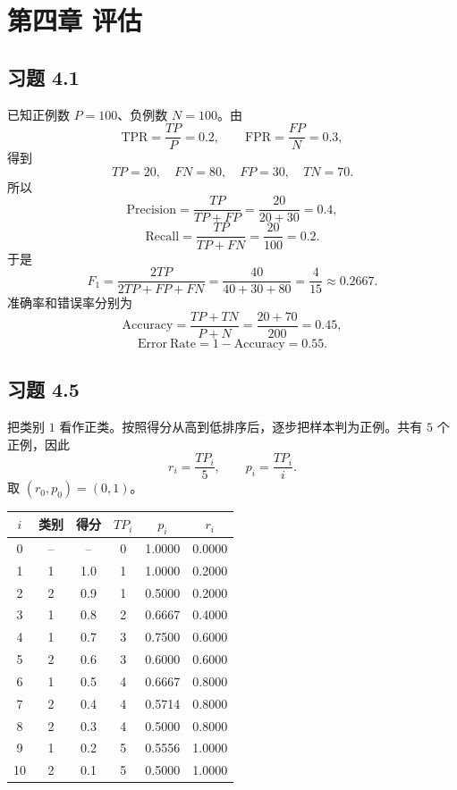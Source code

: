 \documentclass[UTF8,a4paper,12pt]{ctexart}
\begin{document}
\section*{第四章 评估}

\subsection*{习题 4.1}

已知正例数 $P=100$、负例数 $N=100$。由
\[
    \mathrm{TPR}=\frac{TP}{P}=0.2,\qquad
    \mathrm{FPR}=\frac{FP}{N}=0.3,
\]
得到
\[
    TP=20,\quad FN=80,\quad FP=30,\quad TN=70.
\]
所以
\[
    \mathrm{Precision}=\frac{TP}{TP+FP}
      =\frac{20}{20+30}=0.4,
\]
\[
    \mathrm{Recall}=\frac{TP}{TP+FN}
      =\frac{20}{100}=0.2.
\]
于是
\[
    F_1=\frac{2TP}{2TP+FP+FN}
      =\frac{40}{40+30+80}
      =\frac{4}{15}\approx 0.2667.
\]
准确率和错误率分别为
\[
    \mathrm{Accuracy}=\frac{TP+TN}{P+N}
      =\frac{20+70}{200}=0.45,
\]
\[
    \mathrm{Error\ Rate}=1-\mathrm{Accuracy}=0.55.
\]

\subsection*{习题 4.5}

把类别 $1$ 看作正类。按照得分从高到低排序后，逐步把样本判为正例。共有 $5$ 个正例，因此
\[
    r_i=\frac{TP_i}{5},\qquad p_i=\frac{TP_i}{i}.
\]
取 $(r_0,p_0)=(0,1)$。

\begin{center}
\begin{tabular}{cccccc}
\toprule
$i$ & 类别 & 得分 & $TP_i$ & $p_i$ & $r_i$\\
\midrule
0 & -- & --  & 0 & 1.0000 & 0.0000\\
1 & 1  & 1.0 & 1 & 1.0000 & 0.2000\\
2 & 2  & 0.9 & 1 & 0.5000 & 0.2000\\
3 & 1  & 0.8 & 2 & 0.6667 & 0.4000\\
4 & 1  & 0.7 & 3 & 0.7500 & 0.6000\\
5 & 2  & 0.6 & 3 & 0.6000 & 0.6000\\
6 & 1  & 0.5 & 4 & 0.6667 & 0.8000\\
7 & 2  & 0.4 & 4 & 0.5714 & 0.8000\\
8 & 2  & 0.3 & 4 & 0.5000 & 0.8000\\
9 & 1  & 0.2 & 5 & 0.5556 & 1.0000\\
10& 2  & 0.1 & 5 & 0.5000 & 1.0000\\
\bottomrule
\end{tabular}
\end{center}
\end{document}
